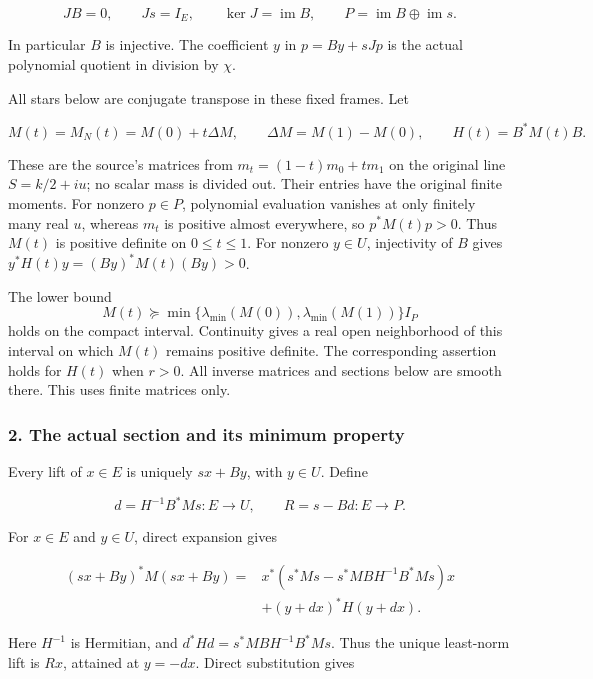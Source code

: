 \[
JB=0,\qquad Js=I_E,\qquad
\ker J=\operatorname{im}B,\qquad
P=\operatorname{im}B\oplus\operatorname{im}s.
\tag{AV3}
\]

In particular \(B\) is injective. The coefficient \(y\) in \(p=By+sJp\) is the actual polynomial quotient in division by \(\chi\).

All stars below are conjugate transpose in these fixed frames. Let

\[
M(t)=M_N(t)=M(0)+t\Delta M,\qquad
\Delta M=M(1)-M(0),\qquad H(t)=B^*M(t)B.
\tag{AV4}
\]

These are the source's matrices from \(m_t=(1-t)m_0+tm_1\) on the original line \(S=k/2+iu\); no scalar mass is divided out. Their entries have the original finite moments. For nonzero \(p\in P\), polynomial evaluation vanishes at only finitely many real \(u\), whereas \(m_t\) is positive almost everywhere, so \(p^*M(t)p>0\). Thus \(M(t)\) is positive definite on \(0\le t\le1\). For nonzero \(y\in U\), injectivity of \(B\) gives \(y^*H(t)y=(By)^*M(t)(By)>0\).

The lower bound \[
M(t)\succeq
\min\{\lambda_{\min}(M(0)),\lambda_{\min}(M(1))\}I_P
\] holds on the compact interval. Continuity gives a real open neighborhood of this interval on which \(M(t)\) remains positive definite. The corresponding assertion holds for \(H(t)\) when \(r>0\). All inverse matrices and sections below are smooth there. This uses finite matrices only.

\subsubsection{2. The actual section and its minimum property}\label{endpoint-variation_review--the-actual-section-and-its-minimum-property}

Every lift of \(x\in E\) is uniquely \(sx+By\), with \(y\in U\). Define

\[
d=H^{-1}B^*Ms:E\longrightarrow U,\qquad
R=s-Bd:E\longrightarrow P.
\tag{AV5}
\]

For \(x\in E\) and \(y\in U\), direct expansion gives

\[
\begin{aligned}
(sx+By)^*M(sx+By)
={}&x^*(s^*Ms-s^*MBH^{-1}B^*Ms)x\\
&+(y+dx)^*H(y+dx).
\end{aligned}
\tag{AV6}
\]

Here \(H^{-1}\) is Hermitian, and \(d^*Hd=s^*MBH^{-1}B^*Ms\). Thus the unique least-norm lift is \(Rx\), attained at \(y=-dx\). Direct substitution gives

